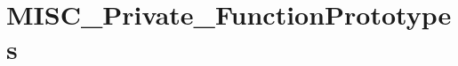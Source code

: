\hypertarget{group___m_i_s_c___private___function_prototypes}{}\section{M\+I\+S\+C\+\_\+\+Private\+\_\+\+Function\+Prototypes}
\label{group___m_i_s_c___private___function_prototypes}
